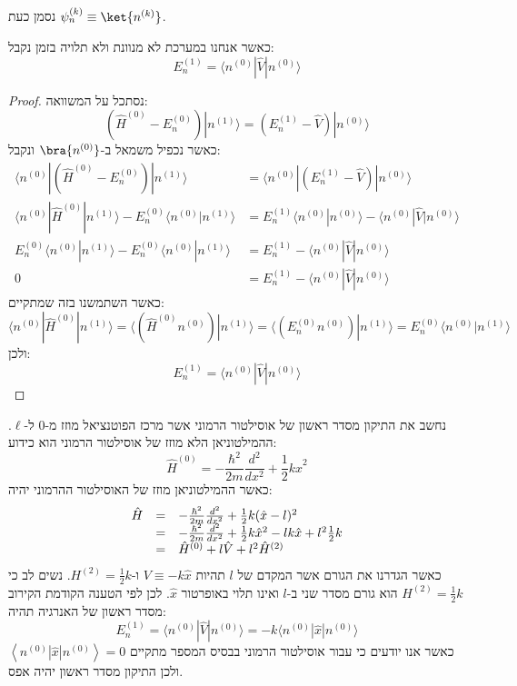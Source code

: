 \documentclass{tstextbook}
\begin{document}
\begin{symbolize}
נסמן כעת \(\psi_{n}^{(k)}\equiv \ket{n^{(k)}}\).

\end{symbolize}
\begin{proposition}
כאשר אנחנו במערכת לא מנוונת ולא תלויה בזמן נקבל:
$$E_{n}^{(1)}=\langle n^{(0)}|\hat{V}|n^{(0)}\rangle$$

\end{proposition}
\begin{proof}
נסתכל על המשוואה:
$$(\hat{H}^{(0)}-E_{n}^{(0)})|n^{(1)}\rangle=(E_{n}^{(1)}-\hat{V})|n^{(0)}\rangle$$
כאשר נכפיל משמאל ב-\(\bra{n^{(0)}}\) ונקבל:
$$\begin{aligned}\langle n^{(0)}|(\hat{H}^{(0)}-E_{n}^{(0)})|n^{(1)}\rangle & =\langle n^{(0)}|(E_{n}^{(1)}-\hat{V})|n^{(0)}\rangle \\\langle n^{(0)}|\hat{H}^{(0)}|n^{(1)}\rangle-E_{n}^{(0)}\langle n^{(0)}|n^{(1)}\rangle & =E_{n}^{(1)}\langle n^{(0)}|n^{(0)}\rangle-\langle n^{(0)}|\hat{V}|n^{(0)}\rangle \\E_n^{(0)}\langle n^{(0)}|n^{(1)}\rangle-E_n^{(0)}\langle n^{(0)}|n^{(1)}\rangle & = E_n^{(1)}-\langle n^{(0)}|\hat{V}|n^{(0)}\rangle \\\mathrm{0} & = E_n^{(1)}-\langle n^{(0)}|\hat{V}|n^{(0)}\rangle
\end{aligned}$$
כאשר השתמשנו בזה שמתקיים:
$$\langle n^{(0)}|\hat{H}^{(0)}|n^{(1)}\rangle=\langle(\hat{H}^{(0)}n^{(0)})|n^{(1)}\rangle=\langle(E_{n}^{(0)}n^{(0)})|n^{(1)}\rangle=E_{n}^{(0)}\langle n^{(0)}|n^{(1)}\rangle$$
ולכן:
$$E_{n}^{(1)}=\langle n^{(0)}|\hat{V}|n^{(0)}\rangle$$

\end{proof}
\begin{example}
נחשב את התיקון מסדר ראשון של אוסילטור הרמוני אשר מרכז הפוטנציאל מוזז מ-0 ל-\(\ell\). ההמילטוניאן הלא מוזז של אוסילטור הרמוני הוא כידוע:
$$\hat{H}^{(0)}=-\frac{\hbar^{2}}{2m}\frac{d^{2}}{d x^{2}}+\frac{1}{2}k\hat{x}^{2}$$
כאשר ההמילטוניאן מוזז של האוסילטור ההרמוני יהיה:
$$\begin{array}{r c l}{{\hat{H}}}&=&{{-\frac{\hbar^{2}}{2m}\frac{d^{2}}{d x^{2}}+\frac{1}{2}k(\hat{x}-l)^{2}}}\\ {{}}&{{=}}&{{-\frac{\hbar^{2}}{2m}\frac{d^{2}}{d x^{2}}+\frac{1}{2}k\hat{x}^{2}-l k\hat{x}+l^{2}\frac{1}{2}k}}\\ {{}}&{{=}}&{{\hat{H}^{(0)}+l\hat{V}+l^{2}\hat{H}^{(2)}}}\end{array}$$
כאשר הגדרנו את הגורם אשר המקדם של \(l\) תהיות \(V\equiv-k\hat{x}\) ו-\(H^{(2)}=\frac{1}{2}k\). נשים לב כי \(H^{(2)} = \frac{1}{2}k\) הוא גורם מסדר שני ב-\(l\) ואינו תלוי באופרטור \(\hat{x}\). לכן לפי הטענה הקודמת הקירוב מסדר ראשון של האנרגיה תהיה:
$$E_{n}^{(1)}=\langle n^{(0)}|\hat{V}|n^{(0)}\rangle=-k\langle n^{(0)}|\hat{x}|n^{(0)}\rangle$$
כאשר אנו יודעים כי עבור אוסילטור הרמוני בבסיס המספר מתקיים \(\left\langle  n^{(0)}|\hat{x}  |n^{(0)}\right\rangle=0\) ולכן התיקון מסדר ראשון יהיה אפס.

\end{example}
\end{document}
